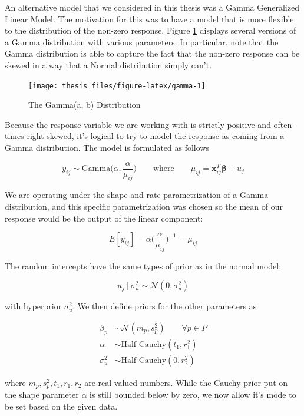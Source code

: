 \documentclass[12pt,twoside]{reedthesis}
\begin{document}
An alternative model that we considered in this thesis was a Gamma Generalized Linear Model. The motivation for this was to have a model that is more flexible to the distribution of the non-zero response. Figure \ref{fig:gamma} displays several versions of a Gamma distribution with various parameters. In particular, note that the Gamma distribution is able to capture the fact that the non-zero response can be skewed in a way that a Normal distribution simply can't.
\begin{figure}

{\centering \texttt{[image: thesis\_files/figure-latex/gamma-1]} 

}

\caption{The Gamma(a, b) Distribution}\label{fig:gamma}
\end{figure}
Because the response variable we are working with is strictly positive and often-times right skewed, it's logical to try to model the response as coming from a Gamma distribution. The model is formulated as follows

\[
y_{ij} \sim \text{Gamma}\bigg(\alpha, \frac{\alpha}{\mu_{ij}}\bigg) \qquad \text{where} \qquad \mu_{ij} = \mathbf{x}_{ij}^T\boldsymbol{\beta} + u_j
\]

We are operating under the shape and rate parametrization of a Gamma distribution, and this specific parametrization was chosen so the mean of our response would be the output of the linear component:

\[
E[y_{ij}] = \alpha \bigg(\frac{\alpha}{\mu_{ij}}\bigg)^{-1} = \mu_{ij}
\]

The random intercepts have the same types of prior as in the normal model:

\[
u_j \ | \ \sigma_{u}^2 \sim \mathcal{N}(0, \sigma_{u}^2)
\]

with hyperprior \(\sigma_{u}^2\). We then define priors for the other parameters as

\[
\begin{aligned}
\beta_p &\sim \mathcal{N}(m_p, s_p^2)  \qquad \forall p\in P \\
\alpha &\sim \text{Half-Cauchy}(t_1, r_1^2)\\
\sigma_{u}^2 &\sim \text{Half-Cauchy}(0, r_2^2)
\end{aligned}
\]

where \(m_p, s_p^2, t_1, r_1, r_2\) are real valued numbers. While the Cauchy prior put on the shape parameter \(\alpha\) is still bounded below by zero, we now allow it's mode to be set based on the given data.
\end{document}
